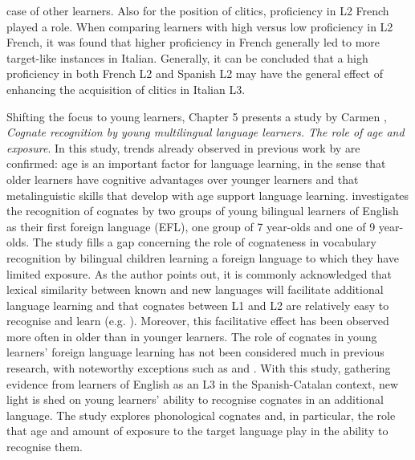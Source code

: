 \documentclass[output=paper,colorlinks,citecolor=brown,nonflat]{langsci/langscibook}
\begin{document}
case of other learners. Also for the position of clitics, proficiency in L2 French played a role. When comparing learners with high versus low proficiency in L2 French, it was found that higher proficiency in French generally led to more target-like instances in Italian. Generally, it can be concluded that a high proficiency in both French L2 and Spanish L2 may have the general effect of enhancing the acquisition of clitics in Italian L3.

Shifting the focus to young learners, Chapter 5 presents a study by Carmen \citeauthor{chapters/munoz}, \textit{Cognate recognition by young multilingual language learners. The role of age and exposure}. In this study, trends already observed in previous work by \citet{Muñoz2006Book, Muñoz2014Complexities} are confirmed: age is an important factor for language learning, in the sense that older learners have cognitive advantages over younger learners and that metalinguistic skills that develop with age support language learning. \citeauthor{chapters/munoz} investigates the recognition of cognates by two groups of young bilingual learners of English as their first foreign language (EFL), one group of 7 year-olds and one of 9 year-olds. The study fills a gap concerning the role of cognateness in vocabulary recognition by bilingual children learning a foreign language to which they have limited exposure. As the author points out, it is commonly acknowledged that lexical similarity between known and new languages will facilitate additional language learning \citep{Ringbom2007} and that cognates between L1 and L2 are relatively easy to recognise and learn (e.g. \citealt{EllisNBeaton1993, DeGrootvanHell2005}). Moreover, this facilitative effect has been observed more often in older than in younger learners. The role of cognates in young learners’ foreign language learning has not been considered much in previous research, with noteworthy exceptions such as \citet{Otwinowska2016} and \citet{GoriotEtAl2018}. With this study, gathering evidence from learners of English as an L3 in the Spanish-Catalan context, new light is shed on young learners’ ability to recognise cognates in an additional language. The study explores phonological cognates and, in particular, the role that age and amount of exposure to the target language play in the ability to recognise them.
\end{document}
